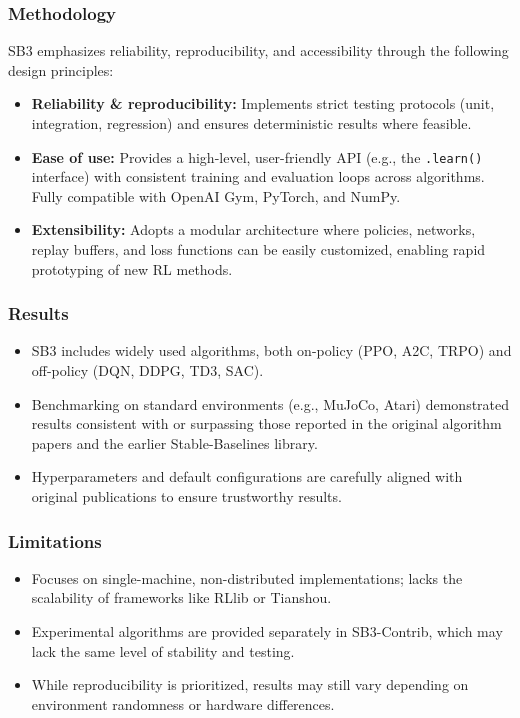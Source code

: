 \documentclass[12pt,a4paper]{report}
\begin{document}
\subsubsection{Methodology}
SB3 emphasizes reliability, reproducibility, and accessibility through the following design principles:
\begin{itemize}
    \item \textbf{Reliability \& reproducibility:} Implements strict testing protocols (unit, integration, regression) and ensures deterministic results where feasible.
    \item \textbf{Ease of use:} Provides a high-level, user-friendly API (e.g., the \texttt{.learn()} interface) with consistent training and evaluation loops across algorithms. Fully compatible with OpenAI Gym, PyTorch, and NumPy.
    \item \textbf{Extensibility:} Adopts a modular architecture where policies, networks, replay buffers, and loss functions can be easily customized, enabling rapid prototyping of new RL methods.
\end{itemize}

\subsubsection{Results}
\begin{itemize}
    \item SB3 includes widely used algorithms, both on-policy (PPO, A2C, TRPO) and off-policy (DQN, DDPG, TD3, SAC).  
    \item Benchmarking on standard environments (e.g., MuJoCo, Atari) demonstrated results consistent with or surpassing those reported in the original algorithm papers and the earlier Stable-Baselines library.  
    \item Hyperparameters and default configurations are carefully aligned with original publications to ensure trustworthy results.  
\end{itemize}

\subsubsection{Limitations}
\begin{itemize}
    \item Focuses on single-machine, non-distributed implementations; lacks the scalability of frameworks like RLlib or Tianshou.  
    \item Experimental algorithms are provided separately in SB3-Contrib, which may lack the same level of stability and testing.  
    \item While reproducibility is prioritized, results may still vary depending on environment randomness or hardware differences.  
\end{itemize}
\end{document}
